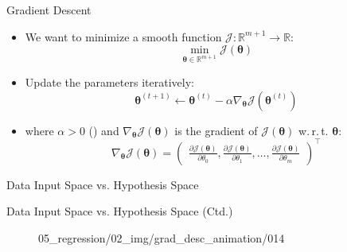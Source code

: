 \begin{frame}{Gradient Descent}{}\important
	\begin{itemize}
		\item We want to minimize a smooth function $\mathcal{J} : \mathbb{R}^{m+1} \rightarrow \mathbb{R}$:
		\begin{equation*}
			\min_{\bm{\theta} \in \mathbb{R}^{m+1}} \mathcal{J}(\bm{\theta})
		\end{equation*}
		\item Update the parameters iteratively:
		\begin{equation}
			\bm{\theta}^{(t+1)} \longleftarrow \bm{\theta}^{(t)} -
				\alpha \nabla_{\bm{\theta}} \mathcal{J}(\bm{\theta}^{(t)})
		\end{equation}
		\item where $\alpha > 0$ () and $\nabla_{\bm{\theta}} \mathcal{J}(\bm{\theta})$
			is the gradient of $\mathcal{J}(\bm{\theta})$ w.\,r.\,t. $\bm{\theta}$:
		\begin{equation*}
			\nabla_{\bm{\theta}} \mathcal{J}(\bm{\theta}) = 
			\begin{pmatrix}
				\frac{\partial \mathcal{J}(\bm{\theta})}{\partial \theta_0},
				\frac{\partial \mathcal{J}(\bm{\theta})}{\partial \theta_1}, 
				\dots,
				\frac{\partial \mathcal{J}(\bm{\theta})}{\partial \theta_{m}}
			\end{pmatrix}^{\intercal}
		\end{equation*}
	\end{itemize}
\end{frame}


\begin{frame}{Data Input Space vs. Hypothesis Space}{}
\end{frame}


\begin{frame}{Data Input Space vs. Hypothesis Space (Ctd.)}{}\important
	\begin{figure}
		\centering
			{05_regression/02_img/grad_desc_animation/}{0}{14}
	\end{figure}
\end{frame}


